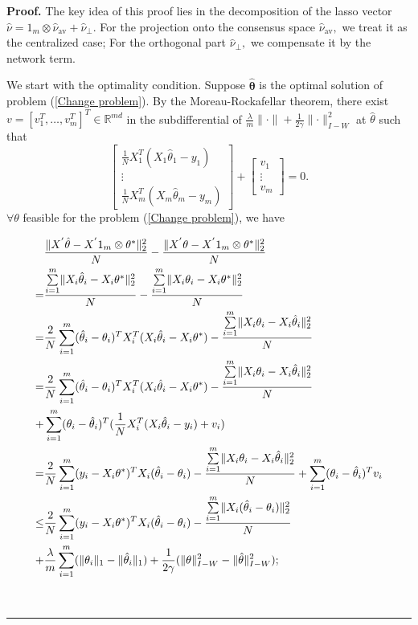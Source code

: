 \documentclass{article}
\theoremstyle{break}
\newenvironment{proof}[1][Proof]{\noindent\textbf{#1.} }{\ \rule{0.5em}{0.5em}}
\newcommand{\T}{\theta}
\begin{document}
\begin{proof}
The key idea of this proof lies in the decomposition of the lasso vector $\hat{\nu}=1_m\otimes\hat{\nu}_{\text{av}}+\hat{\nu}_{\perp}.$ For the projection onto the consensus space $\hat{\nu}_{
\text{av}},$ we treat it as the centralized case; For the orthogonal part $\hat{\nu}_{\perp},$ we compensate it by the network term.

We start with the optimality condition. Suppose $\hat{\mathbf{\T}}$ is the optimal solution of problem (\ref{Change problem}). By the Moreau-Rockafellar theorem, there exist $v=[v_1^T, \dots, v_m^T]^T\in\mathbb{R}^{m d}$ in the subdifferential of $\frac{\lambda}{m}\lVert\cdot\rVert+\frac{1}{2\gamma}\lVert\cdot\rVert_{I-W}^2$ at $\hat{\theta}$
 such that 
 $$\left[\begin{matrix}
 \frac{1}{N}X_1^T(X_1\hat{\theta}_1-y_1)\\
 \vdots\\
 \frac{1}{N}X_m^T(X_m\hat{\theta}_m-y_m)
\end{matrix}\right]+\left[\begin{matrix} v_1\\ \vdots\\v_m
 \end{matrix}\right]=0.$$ $\forall\T$ feasible for the problem (\ref{Change problem}), we have

\begin{align}\label{noparametric oracle}
    &\frac{\lVert X^{'}\hat{\theta}-X^{'}1_m\otimes \T^*\rVert_2^2}{N}-\frac{\lVert X^{'}\T-X^{'}1_m\otimes \T^*\rVert_2^2}{N}\notag\\
    =&\frac{\sum\limits_{i=1}^m\lVert X_i\hat{\theta}_i-X_i\T^*\rVert_2^2}{N}-\frac{\sum\limits_{i=1}^m\lVert X_i\theta_i-X_i\T^*\rVert_2^2}{N}\notag\\
    =&\frac{2}{N}\sum\limits_{i=1}^m(\hat{\theta}_i-\theta_i)^TX_i^T(X_i\hat{\theta}_i-X_i\T^*)-\frac{\sum\limits_{i=1}^m\lVert X_i\theta_i-X_i\hat{\theta}_i\rVert_2^2}{N}\notag\\
    =&\frac{2}{N}\sum\limits_{i=1}^m(\hat{\theta}_i-\theta_i)^TX_i^T(X_i\hat{\theta}_i-X_i\T^*)-\frac{\sum\limits_{i=1}^m\lVert X_i\theta_i-X_i\hat{\theta}_i\rVert_2^2}{N}\notag\\
    +&\sum\limits_{i=1}^m(\theta_i-\hat{\theta}_i)^T(\frac{1}{N}X_i^T(X_i\hat{\theta}_i-y_i)+v_i)\notag\\
    =&\frac{2}{N}\sum\limits_{i=1}^m (y_i-X_i\T^*)^TX_i(\hat{\theta}_i-\theta_i)-\frac{\sum\limits_{i=1}^m\lVert X_i\theta_i-X_i\hat{\theta}_i\rVert_2^2}{N}+\sum\limits_{i=1}^m(\theta_i-\hat{\theta}_i)^T  v_i\notag\\
    \leq& \frac{2}{N}\sum\limits_{i=1}^m (y_i-X_i\T^*)^TX_i(\hat{\theta}_i-\theta_i)-\frac{\sum\limits_{i=1}^m\lVert X_i(\hat{\theta}_i-\theta_i)\rVert_2^2}{N}\notag\\
    +&\frac{\lambda}{m}\sum\limits_{i=1}^m(\lVert\theta_i\rVert_1-\lVert\hat{\theta}_i\rVert_1)+\frac{1}{2\gamma}(\lVert\T\rVert_{I-W}^2-\lVert\hat{\T}\rVert_{I-W}^2);\notag\\
\end{align}



\end{proof}
\end{document}
